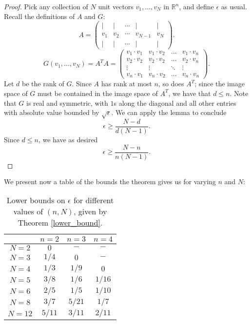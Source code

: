 \documentclass[11pt,letterpaper,twoside,english]{article}
\theoremstyle{theorem}
\theoremstyle{remark}
\begin{document}
\begin{proof}
Pick any collection of $N$ unit vectors $v_1,\ldots, v_N$ in $\mathbb R^n$, and define $\epsilon$ as usual. Recall the definitions of $A$ and $G$:
\[A=\left(\begin{matrix}
| & | & \cdots & | & |\\
v_1 & v_2 & \cdots & v_{N-1} & v_N\\
| & | & \cdots & | & | \end{matrix}\right).\] 
\[G(v_1,\ldots, v_N)=A^TA=\left(\begin{matrix}
v_1\cdot v_1 & v_1\cdot v_2 & \ldots & v_1\cdot v_n\\
v_2\cdot v_2 & v_2\cdot v_2 & \ldots & v_2\cdot v_n\\
\vdots & \vdots & \ddots & \vdots\\
v_n\cdot v_1 & v_n\cdot v_2 & \ldots & v_n\cdot v_n\end{matrix}\right).\]
Let $d$ be the rank of $G$. Since $A$ has rank at most $n$, so does $A^T$; since the image space of $G$ must be contained in the image space of $A^T$, we have that $d\leq n$. Note that $G$ is real and symmetric, with $1$s along the diagonal and all other entries with absolute value bounded by $\sqrt \epsilon$. We can apply the lemma to conclude
\[\epsilon\geq \frac{N-d}{d(N-1)}.\]
Since $d\leq n$, we have as desired
\[\epsilon\geq \frac{N-n}{n(N-1)}.\]
\end{proof}
We present now a table of the bounds the theorem gives us for varying $n$ and $N$:
\begin{table}[h]
   \centering
    \begin{tabular}{ | c | c | c | c |}
    \hline
      & $n=2$ & $n=3$ & $n=4$ \\ \hline
    $N=2$ & $0$ & $-$ & $-$ \\ \hline
    $N=3$ & $1/4$ & $0$ & $-$ \\ \hline
    $N=4$ & $1/3$ & $1/9$ & $0$ \\ \hline
    $N=5$ & $3/8$ & $1/6$ & $1/16$ \\ \hline
    $N=6$ & $2/5$ & $1/5$ & $1/10$ \\ \hline
    $N=8$ &  $3/7$ & $5/21$ & $1/7$ \\ \hline
    $N=12$ & $5/11$ & $3/11$ & $2/11$ \\
    \hline
    \end{tabular}
    \caption {Lower bounds on $\epsilon$ for different values of $(n, N)$, given by Theorem \ref{lower_bound}.}
    \end{table}
\end{document}
